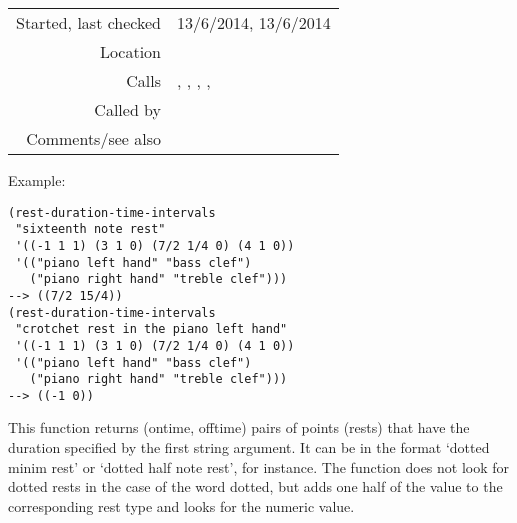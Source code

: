 \vspace{0.3cm}
\begin{tabular}{r|p{8cm}}
Started, last checked & 13/6/2014, 13/6/2014 \\
Location & \nameref{sec:kern-rests} \\
Calls & \nameref{fun:dataset-restricted-to-m-in-nth}, \nameref{fun:duration-string2numeric}, \nameref{fun:modify-question-by-staff-restriction}, \nameref{fun:pitch-and-octave2MIDI-morphetic-pair}, \nameref{fun:restrict-dataset-in-nth-to-xs} \\
Called by & \nameref{fun:c@merata2014-question2answer} \\
Comments/see also & \nameref{fun:duration-time-intervals}
\end{tabular}

\vspace{0.5cm}
\noindent Example:
\begin{verbatim}
(rest-duration-time-intervals
 "sixteenth note rest"
 '((-1 1 1) (3 1 0) (7/2 1/4 0) (4 1 0))
 '(("piano left hand" "bass clef")
   ("piano right hand" "treble clef")))
--> ((7/2 15/4))
(rest-duration-time-intervals
 "crotchet rest in the piano left hand"
 '((-1 1 1) (3 1 0) (7/2 1/4 0) (4 1 0))
 '(("piano left hand" "bass clef")
   ("piano right hand" "treble clef")))
--> ((-1 0))
\end{verbatim}

\noindent This function returns (ontime, offtime)
pairs of points (rests) that have the duration
specified by the first string argument. It can be in
the format `dotted minim rest' or `dotted half note
rest', for instance. The function does not look for
dotted rests in the case of the word dotted, but adds
one half of the value to the corresponding rest type
and looks for the numeric value.























